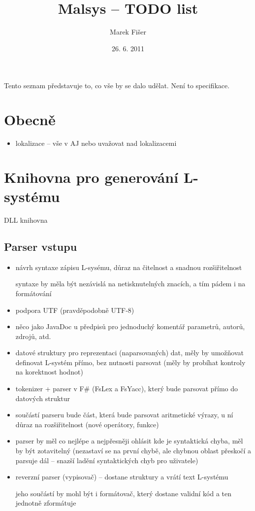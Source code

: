 \documentclass[12pt, a4paper]{article}
\title{Malsys -- TODO list}
\author{Marek Fišer}
\date{26. 6. 2011}
\begin{document}
\maketitle

Tento seznam představuje to, co vše by se dalo udělat. Není to specifikace.


\section{Obecně}
\begin{itemize}
	\item lokalizace -- vše v AJ nebo uvažovat nad lokalizacemi
\end{itemize}


\section{Knihovna pro generování L-systému}
DLL knihovna

\subsection{Parser vstupu}
\begin{itemize}
	\item návrh syntaxe zápisu L-sysému, důraz na čitelnost a snadnou rozšiřitelnost
		
		syntaxe by měla být nezávislá na netisknutelných znacích, a tím pádem i na formátování
	
	\item podpora UTF (pravděpodobně UTF-8)
	
	\item něco jako JavaDoc u předpisů pro jednoduchý komentář parametrů, autorů, zdrojů, atd.

	\item datové struktury pro reprezentaci  (naparsovaných) dat, měly by umožňovat definovat L-systém přímo, bez nutnosti parsovat (měly by probíhat kontroly na korektnost hodnot)
	
	\item tokenizer + parser v F\# (FsLex a FsYacc), který bude parsovat přímo do datových struktur
	
	\item součástí parseru bude část, která bude parsovat aritmetické výrazy, u ní důraz na rozšiřitelnost (nové operátory, funkce)
	
	\item parser by měl co nejlépe a nejpřesněji ohlásit kde je syntaktická chyba, měl by být zotavitelný (nezastaví se na první chybě, ale chybnou oblast přeskočí a parsuje dál -- snazší ladění syntaktických chyb pro uživatele)
	
	\item reverzní parser (vypisovač) -- dostane struktury a vrátí text L-systému
	
		jeho součástí by mohl být i formátovač, který dostane validní kód a ten jednotně zformátuje
\end{itemize}
\end{document}
